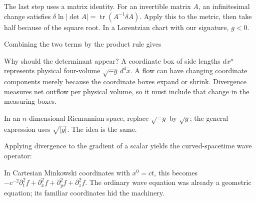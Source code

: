 \documentclass[
  11pt,
  letterpaper,
  oneside,
  openany]{scrbook}
\begin{document}
\begin{center}
\begingroup
{}
\ifdim\wd\grmathbox>\linewidth
\resizebox{\linewidth}{!}{\usebox{\grmathbox}}
\else\usebox{\grmathbox}\fi
\endgroup
\end{center}

The last step uses a matrix identity. For an invertible matrix \(A\), an
infinitesimal change satisfies
\(\delta\ln|\det A|=\operatorname{tr}(A^{-1}\delta A)\). Apply this to
the metric, then take half because of the square root. In a Lorentzian
chart with our signature, \(g<0\).

Combining the two terms by the product rule gives

\begin{center}
\begingroup
{}
\ifdim\wd\grmathbox>\linewidth
\resizebox{\linewidth}{!}{\usebox{\grmathbox}}
\else\usebox{\grmathbox}\fi
\endgroup
\end{center}

Why should the determinant appear? A coordinate box of side lengths
\(dx^\mu\) represents physical four-volume \(\sqrt{-g}\,d^4x\). A flow
can have changing coordinate components merely because the coordinate
boxes expand or shrink. Divergence measures net outflow per physical
volume, so it must include that change in the measuring boxes.

In an \(n\)-dimensional Riemannian space, replace \(\sqrt{-g}\) by
\(\sqrt{g}\); the general expression uses \(\sqrt{|g|}\). The idea is
the same.

Applying divergence to the gradient of a scalar yields the
curved-spacetime wave operator:

\begin{center}
\begingroup
{}
\ifdim\wd\grmathbox>\linewidth
\resizebox{\linewidth}{!}{\usebox{\grmathbox}}
\else\usebox{\grmathbox}\fi
\endgroup
\end{center}

In Cartesian Minkowski coordinates with \(x^0=ct\), this becomes
\(-c^{-2}\partial_t^2f+\partial_x^2f+\partial_y^2f+\partial_z^2f\). The
ordinary wave equation was already a geometric equation; its familiar
coordinates hid the machinery.
\end{document}
